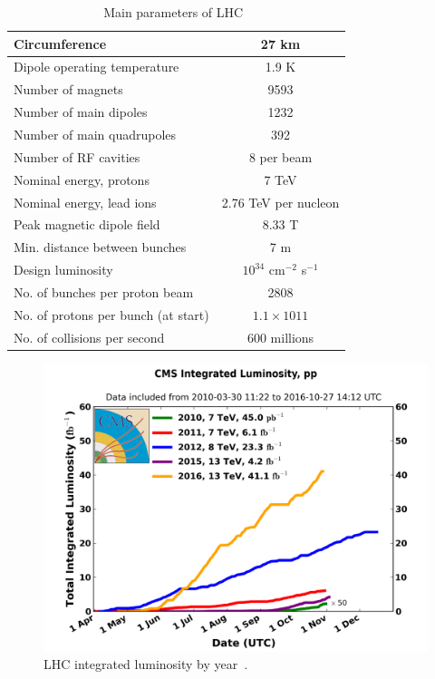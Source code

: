 \begin{table}[h]
  \begin{center}
  \caption{ Main parameters of LHC~\cite{ref_LHC_brochure}}
  \vspace{5 mm}
  \begin{tabular}{|l|c|}
     \hline
     Circumference & 27 km  \\ \hline
     Dipole operating temperature &  1.9 K \\ \hline
     Number of magnets &  9593 \\ \hline
     Number of main dipoles &  1232 \\ \hline
     Number of main quadrupoles &  392 \\ \hline
     Number of RF cavities &  8 per beam \\ \hline
     Nominal energy, protons &  7 TeV \\ \hline
     Nominal energy, lead ions &  2.76 TeV per nucleon \\ \hline
     Peak magnetic dipole field &  8.33 T \\ \hline
     Min. distance between bunches &  7 m \\ \hline
     Design luminosity &  $10^{34}$ cm$^{-2}$ s$^{-1}$ \\ \hline
     No. of bunches per proton beam &  2808 \\ \hline
     No. of protons per bunch (at start) &  $1.1\times 10{11}$ \\ \hline
     No. of collisions per second &  600 millions \\ \hline
  \end{tabular}
  \label{tab:LHCparameters}
  \end{center}
\end{table}

\begin{figure}
  \centering
  \includegraphics[width=.80\linewidth]{../figs/Exp/int_lumi_cumulative_pp_2.png}
  \caption{LHC integrated luminosity by year~\cite{ref_fig_LHClumi}.}
  \label{fig:LHClumi}
\end{figure}

